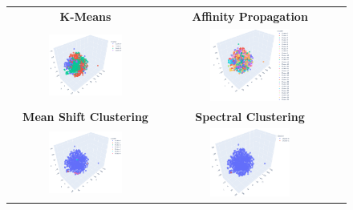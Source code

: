\begin{figure}
	\setlength\tabcolsep{3pt}%
	\centering
	\begin{tabular}{ccc}
		\textbf{K-Means} &
		\textbf{Affinity Propagation} \\
		\includegraphics[width=0.5\textwidth]{NOTEBOOK/IMAGENES_CLUSTERING/TNSE_Kmeans} &
		\includegraphics[width=0.5\textwidth]{NOTEBOOK/IMAGENES_CLUSTERING/TNSE_Affinity_Propagation} \\
		
		\textbf{Mean Shift Clustering} &
		\textbf{Spectral Clustering} \\
		
		\includegraphics[width=0.5\textwidth]{NOTEBOOK/IMAGENES_CLUSTERING/TNSE_Mean_Shift_Clustering} &
		\includegraphics[width=0.5\textwidth]{NOTEBOOK/IMAGENES_CLUSTERING/TNSE_Spectral_ Clustering} \\ 
		

\end{tabular}
\end{figure}
